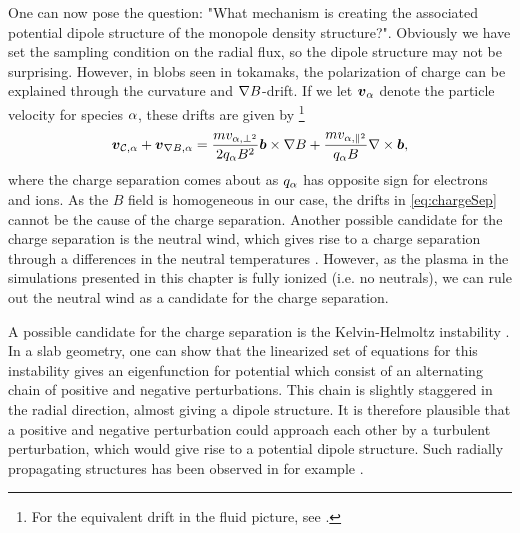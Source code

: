 One can now pose the question:
"What mechanism is creating the associated potential dipole structure of the monopole density structure?".
Obviously we have set the sampling condition on the radial flux, so the dipole structure may not be surprising.
However, in blobs seen in tokamaks, the polarization of charge can be explained through the curvature and $\nabla B$-drift.
If we let $\boldsymbol{v}_\alpha$ denote the particle velocity for species $\alpha$, these drifts are given by%
\footnote{For the equivalent drift in the fluid picture, see \cite{Garcia2003}.}
%
\begin{align}
    \boldsymbol{v}_{\mathcal{C},\alpha} + \boldsymbol{v}_{\nabla B,\alpha} = \frac{m v_{\alpha,\perp^2}}{2q_\alpha B^2}\boldsymbol{b}\times\nabla B + \frac{m v_{\alpha,\|^2}}{q_\alpha B}\nabla\times\boldsymbol{b},
    \label{eq:chargeSep}
\end{align}
%
where the charge separation comes about as $q_\alpha$ has opposite sign for electrons and ions.
As the $B$ field is homogeneous in our case, the drifts in \cref{eq:chargeSep} cannot be the cause of the charge separation.
Another possible candidate for the charge separation is the neutral wind, which gives rise to a charge separation through a differences in the neutral temperatures \cite{Krasheninnikov2003}.
However, as the plasma in the simulations presented in this chapter is fully ionized (i.e. no neutrals), we can rule out the neutral wind as a candidate for the charge separation.

A possible candidate for the charge separation is the Kelvin-Helmoltz instability \cite{Horton1987,Pecseli2012book}.
In a slab geometry, one can show that the linearized set of equations for this instability gives an eigenfunction for potential which consist of an alternating chain of positive and negative perturbations.
This chain is slightly staggered in the radial direction, almost giving a dipole structure.
It is therefore plausible that a positive and negative perturbation could approach each other by a turbulent perturbation, which would give rise to a potential dipole structure.
Such radially propagating structures has been observed in for example \cite{Nielsen1996}.

